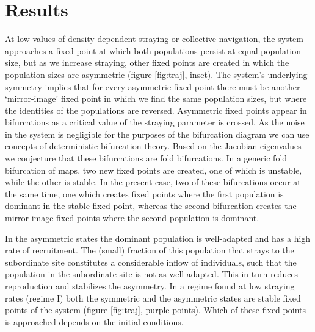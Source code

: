 \documentclass{revtex4}
\begin{document}
\section{Results}

\noindent At low values of density-dependent straying or collective navigation, the system approaches a fixed point at which both populations persist at equal population size, but as we increase straying, other fixed points are created in which the population sizes are asymmetric (figure \ref{fig:traj}, inset).
The system's underlying symmetry implies that for every asymmetric fixed point there must be another `mirror-image' fixed point in which we find the same population sizes, but where the identities of the populations are reversed.
Asymmetric fixed points appear in bifurcations as a critical value of the straying parameter is crossed. 
As the noise in the system is negligible for the purposes of the bifurcation diagram we can use concepts of deterministic bifurcation theory. 
Based on the Jacobian eigenvalues we conjecture that these bifurcations are fold bifurcations. 
In a generic fold bifurcation of maps, two new fixed points are created, one of which is unstable, while the other is stable. 
In the present case, two of these bifurcations occur at the same time, one which creates fixed points where the first population is dominant in the stable fixed point, whereas the second bifurcation creates the mirror-image fixed points where the second population is dominant.      

In the asymmetric states the dominant population is well-adapted and has a high rate of recruitment. 
The (small) fraction of this population that strays to the subordinate site constitutes a considerable inflow of individuals, such that the population in the subordinate site is not as well adapted.
This in turn reduces reproduction and stabilizes the asymmetry. 
In a regime found at low straying rates (regime I) both the symmetric and the asymmetric states are stable fixed points of the system (figure \ref{fig:traj}, purple points). 
Which of these fixed points is approached depends on the initial conditions. 
\end{document}
